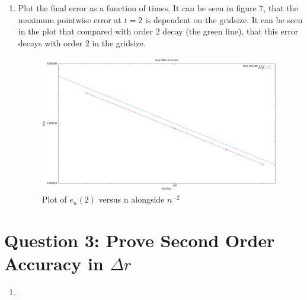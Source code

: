 \documentclass{article}
\begin{document}
\begin{enumerate}[label=\alph*)]
    \item Plot the final error as a function of times. It can be seen in figure
    7, that the maximum pointwise error at $t = 2$ is dependent on the gridsize.
    It can be seen in the plot that compared with order 2 decay (the green
    line), that this error decays with order 2 in the gridsize. 
        \begin{figure}[ht]
            \centering
            \includegraphics[width=.8\textwidth]{final_mpe.png}
            \caption{Plot of $e_n(2)$ versus n alongside $n^{-2}$}
        \end{figure}


\end{enumerate}

\section*{Question 3: Prove Second Order Accuracy in $\Delta r$}

\begin{enumerate}[label=\alph*)]

    \item
\end{enumerate}
\end{document}
